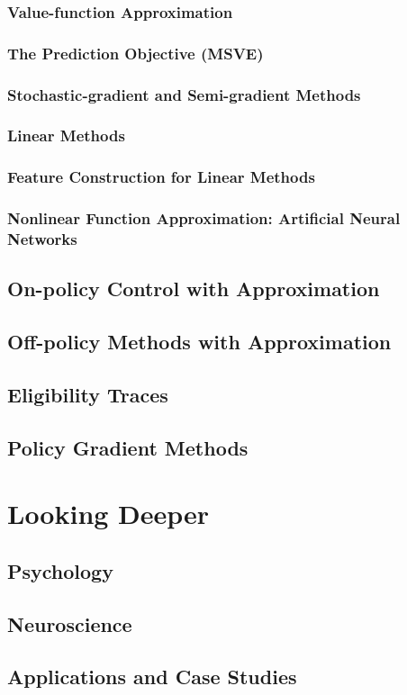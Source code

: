 \documentclass[a4paper,chapter,microtype,fleqn]{oblivoir}
\begin{document}
\section{Value-function Approximation}
\section{The Prediction Objective (MSVE)}
\section{Stochastic-gradient and Semi-gradient Methods}
\section{Linear Methods}
\section{Feature Construction for Linear Methods}
\section{Nonlinear Function Approximation: Artificial Neural Networks}\label{sec:nonlinear-function-approximation-artificial-neural-networks}

\chapter{On-policy Control with Approximation}\label{ch:on-policy-control-with-approximation}

\chapter{Off-policy Methods with Approximation}\label{ch:off-policy-methods-with-approximation}

\chapter{Eligibility Traces}\label{ch:eligibility-traces}

\chapter{Policy Gradient Methods}\label{ch:policy-gradient-methods}

\part{Looking Deeper}\label{pt:looking-deeper}

\chapter{Psychology}\label{ch:psychology}

\chapter{Neuroscience}\label{ch:neuroscience}

\chapter{Applications and Case Studies}\label{ch:applications-and-case-studies}

\nocite{*}
\printbibliography[title=참고~문헌]
\end{document}
